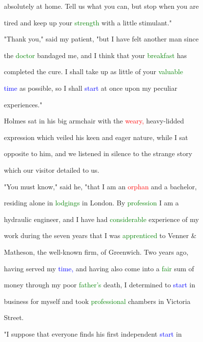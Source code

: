 absolutely at home. Tell us what you can, but stop when you are

 tired and keep up your \textcolor{green}{strength} with a little stimulant."



 "Thank you," said my \textcolor{BurntOrange}{patient,} "but I have felt another man since

 the \textcolor{green}{doctor} bandaged me, and I think that your \textcolor{green}{breakfast} has

 completed the cure. I shall take up as little of your \textcolor{green}{valuable}

 \textcolor{blue}{time} as possible, so I shall \textcolor{blue}{start} at once upon my peculiar

 experiences."



 Holmes sat in his big armchair with the \textcolor{red}{weary,} heavy-lidded

 expression which veiled his keen and \textcolor{BurntOrange}{eager} nature, while I sat

 opposite to him, and we listened in silence to the strange story

 which our \textcolor{BurntOrange}{visitor} detailed to us.



 "You must know," said he, "that I am an \textcolor{red}{orphan} and a bachelor,

 residing alone in \textcolor{green}{lodgings} in London. By \textcolor{green}{profession} I am a

 hydraulic engineer, and I have had \textcolor{green}{considerable} experience of my

 work during the seven years that I was \textcolor{green}{apprenticed} to Venner &

 Matheson, the well-known firm, of Greenwich. Two years ago,

 having \textcolor{BurntOrange}{served} my \textcolor{blue}{time,} and having also come into a \textcolor{green}{fair} sum of

 \textcolor{BurntOrange}{money} through my poor \textcolor{green}{father's} \textcolor{BurntOrange}{death,} I determined to \textcolor{blue}{start} in

 business for myself and took \textcolor{green}{professional} chambers in Victoria

 Street.



 "I suppose that everyone finds his first independent \textcolor{blue}{start} in


